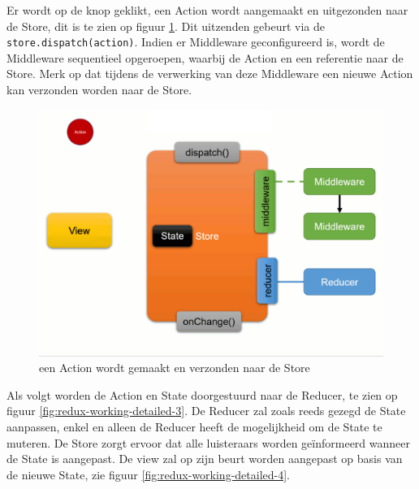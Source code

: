 Er wordt op de knop geklikt, een Action wordt aangemaakt en uitgezonden naar de Store, dit is te zien op figuur \ref{fig:redux-working-detailed-2}. Dit uitzenden gebeurt via de \verb|store.dispatch(action)|. Indien er Middleware geconfigureerd is, wordt de Middleware sequentieel opgeroepen, waarbij de Action en een referentie naar de Store. Merk op dat tijdens de verwerking van deze Middleware een nieuwe Action kan verzonden worden naar de Store.

\begin{figure}[H]
    \centering
    \includegraphics[width=\figureWidthModifier\linewidth]{img/stand-van-zaken/redux-working-detailed-2.png}
    \caption{een Action wordt gemaakt en verzonden naar de Store \textcite{Boelens2019}}
    \label{fig:redux-working-detailed-2}
\end{figure}

Als volgt worden de Action en State doorgestuurd naar de Reducer, te zien op figuur \ref{fig:redux-working-detailed-3}. De Reducer zal zoals reeds gezegd de State aanpassen, enkel en alleen de Reducer heeft de mogelijkheid om de State te muteren. 
De Store zorgt ervoor dat alle luisteraars worden geïnformeerd wanneer de State is aangepast. De view zal op zijn beurt worden aangepast op basis van de nieuwe State, zie figuur \ref{fig:redux-working-detailed-4}.

